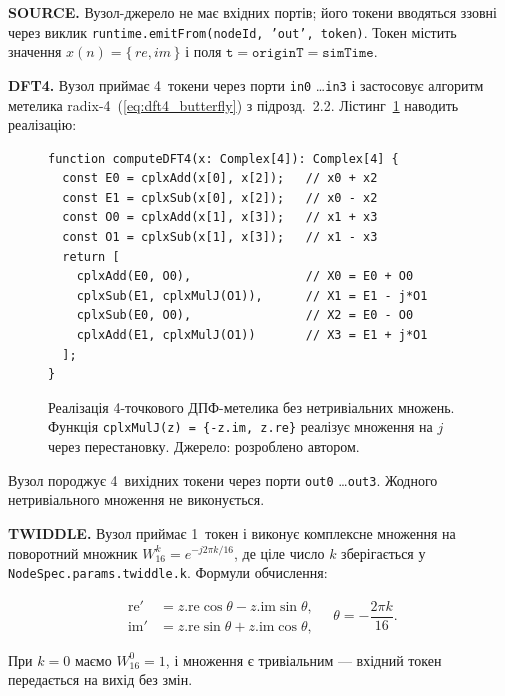 \textbf{SOURCE.} Вузол-джерело не має вхідних портів; його токени
вводяться ззовні через виклик
\texttt{runtime.emitFrom(nodeId, 'out', token)}. Токен містить
значення $x(n) = \{\,re, im\,\}$ і поля
$\texttt{t} = \texttt{originT} = \texttt{simTime}$.

\textbf{DFT4.} Вузол приймає 4~токени через порти \texttt{in0}
\ldots \texttt{in3} і застосовує алгоритм метелика
radix-4~(\ref{eq:dft4_butterfly}) з підрозд.~2.2. Лістинг~\ref{lst:dft4}
наводить реалізацію:

\begin{figure}[H]
\begin{verbatim}
function computeDFT4(x: Complex[4]): Complex[4] {
  const E0 = cplxAdd(x[0], x[2]);   // x0 + x2
  const E1 = cplxSub(x[0], x[2]);   // x0 - x2
  const O0 = cplxAdd(x[1], x[3]);   // x1 + x3
  const O1 = cplxSub(x[1], x[3]);   // x1 - x3
  return [
    cplxAdd(E0, O0),                // X0 = E0 + O0
    cplxSub(E1, cplxMulJ(O1)),      // X1 = E1 - j*O1
    cplxSub(E0, O0),                // X2 = E0 - O0
    cplxAdd(E1, cplxMulJ(O1))       // X3 = E1 + j*O1
  ];
}
\end{verbatim}
\caption{Реалізація 4-точкового ДПФ-метелика без нетривіальних
         множень. Функція \texttt{cplxMulJ(z) = \{-z.im, z.re\}}
         реалізує множення на $j$ через перестановку. Джерело:
         розроблено автором.}
\label{lst:dft4}
\end{figure}

Вузол породжує 4~вихідних токени через порти
\texttt{out0} \ldots \texttt{out3}. Жодного нетривіального множення
не виконується.

\textbf{TWIDDLE.} Вузол приймає 1~токен і виконує комплексне
множення на поворотний множник $W_{16}^k = e^{-j 2\pi k/16}$, де
ціле число $k$ зберігається у \texttt{NodeSpec.params.twiddle.k}.
Формули обчислення:

\begin{equation}
  \begin{aligned}
    \mathrm{re}' &= z.\mathrm{re} \cos\theta - z.\mathrm{im} \sin\theta, \\
    \mathrm{im}' &= z.\mathrm{re} \sin\theta + z.\mathrm{im} \cos\theta,
  \end{aligned}
  \quad \theta = -\frac{2\pi k}{16}.
  \label{eq:twiddle_impl}
\end{equation}

При $k = 0$ маємо $W_{16}^0 = 1$, і множення є тривіальним ---
вхідний токен передається на вихід без змін.

